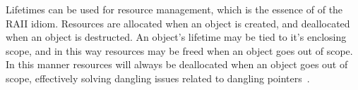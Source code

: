 Lifetimes can be used for resource management, which is the essence of of the
RAII idiom. Resources are allocated when an object is created, and deallocated
when an object is destructed. An object's lifetime may be tied to it's
enclosing scope, and in this way resources may be freed when an object goes out
of scope.  In this manner resources will always be deallocated when an object
goes out of scope, effectively solving dangling issues related to dangling
pointers~\cite{rust}.



%
%
%
%
%
